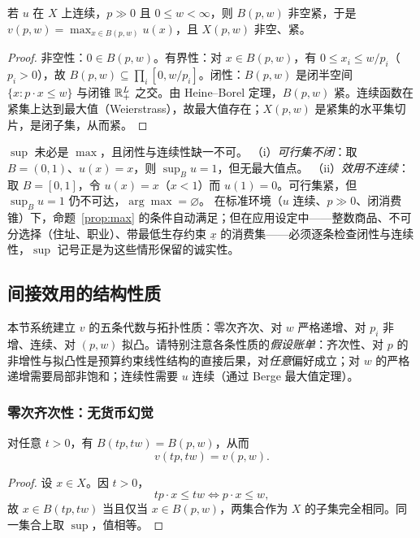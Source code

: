 \begin{proposition}
\label{prop:max}
若 $u$ 在 $X$ 上连续，$p\gg0$ 且 $0\le w<\infty$，则 $B(p,w)$ 非空紧，于是 $v(p,w)=\max_{x\in B(p,w)}u(x)$，且 $X(p,w)$ 非空、紧。
\end{proposition}
\begin{proof}
非空性：$0\in B(p,w)$。有界性：对 $x\in B(p,w)$，有 $0\le x_i\le w/p_i$（$p_i>0$），故 $B(p,w)\subseteq\prod_i[0,w/p_i]$。闭性：$B(p,w)$ 是闭半空间 $\{x:p\cdot x\le w\}$ 与闭锥 $\mathbb{R}^L_+$ 之交。由 Heine--Borel 定理，$B(p,w)$ 紧。连续函数在紧集上达到最大值（Weierstrass），故最大值存在；$X(p,w)$ 是紧集的水平集切片，是闭子集，从而紧。
\end{proof}

\begin{example}[两种失效方式]
\label{ex:fail}
$\sup$ 未必是 $\max$，且闭性与连续性缺一不可。
（i）\emph{可行集不闭}：取 $B=(0,1)$、$u(x)=x$，则 $\sup_Bu=1$，但无最大值点。
（ii）\emph{效用不连续}：取 $B=[0,1]$，令 $u(x)=x$（$x<1$）而 $u(1)=0$。可行集紧，但 $\sup_Bu=1$ 仍不可达，$\arg\max=\varnothing$。
在标准环境（$u$ 连续、$p\gg0$、闭消费锥）下，命题~\ref{prop:max} 的条件自动满足；但在应用设定中——整数商品、不可分选择（住址、职业）、带最低生存约束 $\underline x$ 的消费集——必须逐条检查闭性与连续性，$\sup$ 记号正是为这些情形保留的诚实性。
\end{example}

\subsection{间接效用的结构性质}

本节系统建立 $v$ 的五条代数与拓扑性质：零次齐次、对 $w$ 严格递增、对 $p_i$ 非增、连续、对 $(p,w)$ 拟凸。请特别注意各条性质的\emph{假设账单}：齐次性、对 $p$ 的非增性与拟凸性是预算约束线性结构的直接后果，对\emph{任意}偏好成立；对 $w$ 的严格递增需要局部非饱和；连续性需要 $u$ 连续（通过 Berge 最大值定理）。

\subsubsection{零次齐次性：无货币幻觉}

\begin{theorem}[零次齐次性]
\label{thm:homog}
对任意 $t>0$，有 $B(tp,tw)=B(p,w)$，从而
\[
v(tp,tw)=v(p,w).
\]
\end{theorem}
\begin{proof}
设 $x\in X$。因 $t>0$，
\[
tp\cdot x\le tw\iff p\cdot x\le w,
\]
故 $x\in B(tp,tw)$ 当且仅当 $x\in B(p,w)$，两集合作为 $X$ 的子集完全相同。同一集合上取 $\sup$，值相等。
\end{proof}

